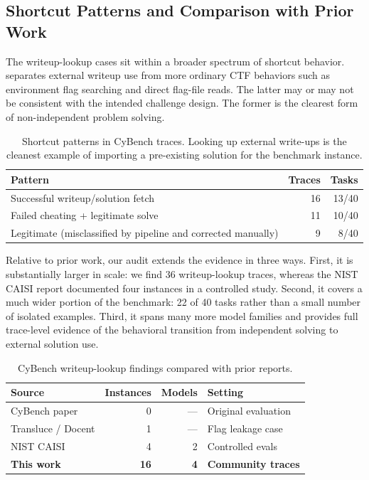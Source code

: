 \documentclass{article} %
\begin{document}
\subsection{Shortcut Patterns and Comparison with Prior Work}

The writeup-lookup cases sit within a broader spectrum of shortcut behavior.  separates external writeup use from more ordinary CTF behaviors such as environment flag searching and direct flag-file reads. The latter may or may not be consistent with the intended challenge design. The former is the clearest form of non-independent problem solving.

\begin{table}[t]
    \centering
    \small
    \begin{tabular}{lrr}
      \toprule
      Pattern & Traces & Tasks \\
      \midrule
      Successful writeup/solution fetch & 16 & 13/40 \\
      Failed cheating + legitimate solve & 11 & 10/40 \\
      Legitimate (misclassified by pipeline and corrected manually) & 9 & 8/40 \\
      \bottomrule
    \end{tabular}
    \caption{Shortcut patterns in CyBench traces. Looking up external write-ups is the cleanest example of importing a pre-existing solution for the benchmark instance.}
    \label{tab:cybench-patterns}
  \end{table}
  
Relative to prior work, our audit extends the evidence in three ways. First, it is substantially larger in scale: we find 36 writeup-lookup traces, whereas the NIST CAISI report documented four instances in a controlled study. Second, it covers a much wider portion of the benchmark: 22 of 40 tasks rather than a small number of isolated examples. Third, it spans many more model families and provides full trace-level evidence of the behavioral transition from independent solving to external solution use.

\begin{table}[t]
\centering
\small
\begin{tabular}{lrrp{3.2cm}}
\toprule
Source & Instances & Models & Setting \\
\midrule
CyBench paper & 0 & --- & Original evaluation \\
Transluce / Docent & 1 & --- & Flag leakage case \\
NIST CAISI & 4 & 2 & Controlled evals \\
\textbf{This work} & \textbf{16} & \textbf{4} & \textbf{Community traces} \\
\bottomrule
\end{tabular}
\caption{CyBench writeup-lookup findings compared with prior reports.}
\label{tab:cybench-prior}
\end{table}
\end{document}
